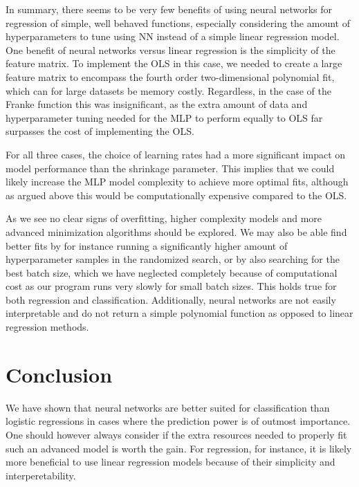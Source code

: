 \documentclass[a4paper, 11pt, twocolumn]{article}
\begin{document}
In summary, there seems to be very few benefits of using neural networks for
regression of simple, well behaved functions, especially considering the amount
of hyperparameters to tune using NN instead of a simple linear regression model.
One benefit of neural networks versus linear regression is the simplicity of the
feature matrix. To implement the OLS in this case, we needed to create a large
feature matrix to encompass the fourth order two-dimensional polynomial fit,
which can for large datasets be memory costly. Regardless, in the case of the
Franke function this was insignificant,  as the extra amount of data and
hyperparameter tuning needed for the MLP to perform equally to OLS far surpasses
the cost of implementing the OLS.

For all three cases, the choice of learning rates had a more significant impact
on model performance than the shrinkage parameter. This implies that we could
likely increase the MLP model complexity to achieve more optimal fits, although as
argued above this would be computationally expensive compared to the OLS.


As we see no clear signs of overfitting, higher complexity models and more 
advanced minimization algorithms should be explored. We may also be able find 
better fits by for instance running a significantly higher amount of 
hyperparameter samples in the randomized search, or by also searching for the 
best batch size, which we have neglected completely because of computational 
cost as our program runs very slowly for small batch sizes. This holds true for 
both regression and classification. Additionally, neural networks are not easily 
interpretable and do not return a simple polynomial function as opposed to linear
regression methods.

\section{Conclusion}
We have shown that neural networks are better suited for classification than
logistic regressions in cases where the prediction power is of outmost importance.
One should however always consider if the extra resources needed to properly
fit such an advanced model is worth the gain. For regression, for instance, it
is likely more beneficial to use linear regression models because of their
simplicity and interperetability.
\end{document}
